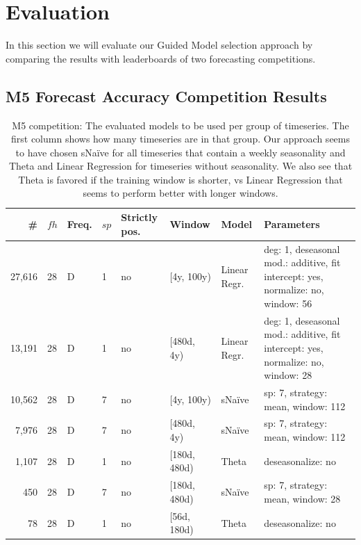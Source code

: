 \section{Evaluation}

In this section we will evaluate our Guided Model selection approach by comparing the results with leaderboards of two forecasting competitions.


\subsection{M5 Forecast Accuracy Competition Results}


\begin{table}
\fontsize{9pt}{12pt}\selectfont
\begin{tabular}{rlllll|lp{5cm}}
\#      & $fh$ & Freq. & $sp$ & Strictly pos. & Window       & Model & Parameters \\
\hline
 27,616 &  28  & D     & 1    & no            & [4y,   100y) & Linear Regr. & deg: 1, deseasonal mod.: additive, fit intercept: yes, normalize: no, window: 56 \\
 13,191 &  28  & D     & 1    & no            & [480d, 4y)   & Linear Regr. & deg: 1, deseasonal mod.: additive, fit intercept: yes, normalize: no, window: 28 \\
 10,562 &  28  & D     & 7    & no            & [4y,   100y) & sNa\"ive     & sp: 7, strategy: mean, window: 112 \\
  7,976 &  28  & D     & 7    & no            & [480d, 4y)   & sNa\"ive     & sp: 7, strategy: mean, window: 112 \\
  1,107 &  28  & D     & 1    & no            & [180d, 480d) & Theta        & deseasonalize: no \\
    450 &  28  & D     & 7    & no            & [180d, 480d) & sNa\"ive     & sp: 7, strategy: mean, window: 28 \\     
     78 &  28  & D     & 1    & no            & [56d,  180d) & Theta        & deseasonalize: no
\end{tabular}
\caption{M5 competition: The evaluated models to be used per group of timeseries. The first column shows how many timeseries are in that group. Our approach seems to have chosen sNa\"ive for all timeseries that contain a weekly seasonality and Theta and Linear Regression for timeseries without seasonality. We also see that Theta is favored if the training window is shorter, vs Linear Regression that seems to perform better with longer windows.}
\label{tab:m5GroupsAndModels}
\end{table}


